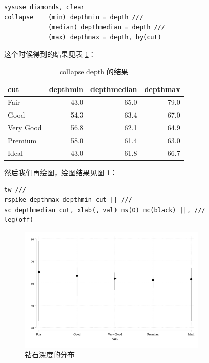 \documentclass[]{ctexbook}
\begin{document}
\begin{lstlisting}
sysuse diamonds, clear
collapse    (min) depthmin = depth ///
            (median) depthmedian = depth ///
            (max) depthmax = depth, by(cut)
\end{lstlisting}

这个时候得到的结果见表 \ref{tab:depthmmm}：

\begin{table}[t]

\caption{\label{tab:depthmmm}collapse depth 的结果}
\centering
\begin{tabular}{lrrr}
\toprule
cut & depthmin & depthmedian & depthmax\\
\midrule
Fair & 43.0 & 65.0 & 79.0\\
Good & 54.3 & 63.4 & 67.0\\
Very Good & 56.8 & 62.1 & 64.9\\
Premium & 58.0 & 61.4 & 63.0\\
Ideal & 43.0 & 61.8 & 66.7\\
\bottomrule
\end{tabular}
\end{table}

然后我们再绘图，绘图结果见图 \ref{fig:depth3m}：

\begin{lstlisting}
tw ///
rspike depthmax depthmin cut || ///
sc depthmedian cut, xlab(, val) ms(O) mc(black) ||, ///
leg(off)
\end{lstlisting}

\begin{figure}

{\centering \includegraphics[width=0.8\textwidth]{assets/depth3m} 

}

\caption{钻石深度的分布}\label{fig:depth3m}
\end{figure}
\end{document}
